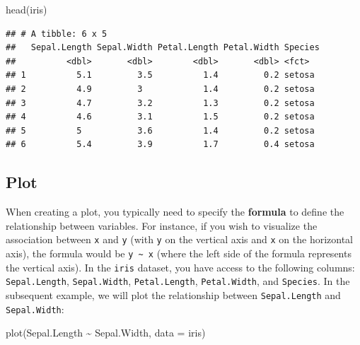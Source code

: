 \documentclass[
]{article}
\newenvironment{Shaded}{\begin{snugshade}}{\end{snugshade}}
\newcommand{\AttributeTok}[1]{\textcolor[rgb]{0.77,0.63,0.00}{#1}}
\newcommand{\FunctionTok}[1]{\textcolor[rgb]{0.00,0.00,0.00}{#1}}
\newcommand{\NormalTok}[1]{#1}
\newcommand{\SpecialCharTok}[1]{\textcolor[rgb]{0.00,0.00,0.00}{#1}}
\begin{document}
\begin{Shaded}
\begin{Highlighting}[]
\FunctionTok{head}\NormalTok{(iris)}
\end{Highlighting}
\end{Shaded}

\begin{verbatim}
## # A tibble: 6 x 5
##   Sepal.Length Sepal.Width Petal.Length Petal.Width Species
##          <dbl>       <dbl>        <dbl>       <dbl> <fct>  
## 1          5.1         3.5          1.4         0.2 setosa 
## 2          4.9         3            1.4         0.2 setosa 
## 3          4.7         3.2          1.3         0.2 setosa 
## 4          4.6         3.1          1.5         0.2 setosa 
## 5          5           3.6          1.4         0.2 setosa 
## 6          5.4         3.9          1.7         0.4 setosa
\end{verbatim}

\hypertarget{plot}{%
\subsection{Plot}\label{plot}}

When creating a plot, you typically need to specify the \textbf{formula} to define the relationship between variables. For instance, if you wish to visualize the association between \texttt{x} and \texttt{y} (with \texttt{y} on the vertical axis and \texttt{x} on the horizontal axis), the formula would be \texttt{y\ \textasciitilde{}\ x} (where the left side of the formula represents the vertical axis). In the \texttt{iris} dataset, you have access to the following columns: \texttt{Sepal.Length}, \texttt{Sepal.Width}, \texttt{Petal.Length}, \texttt{Petal.Width}, and \texttt{Species}. In the subsequent example, we will plot the relationship between \texttt{Sepal.Length} and \texttt{Sepal.Width}:

\begin{Shaded}
\begin{Highlighting}[]
\FunctionTok{plot}\NormalTok{(Sepal.Length }\SpecialCharTok{\textasciitilde{}}\NormalTok{ Sepal.Width, }\AttributeTok{data =}\NormalTok{ iris)}
\end{Highlighting}
\end{Shaded}
\end{document}

